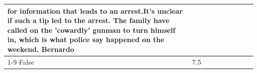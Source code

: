 \begin{table}[H]
\begin{tabular}{lllrlllll}
for information that leads to an arrest.It's unclear if such a tip led to the arrest. The family have called on the 'cowardly' gunman to turn himself in, which is what police say happened on the weekend. Bernardo \\
\cline{1-9}
False & 7.5%
\end{tabular}
\end{table}

